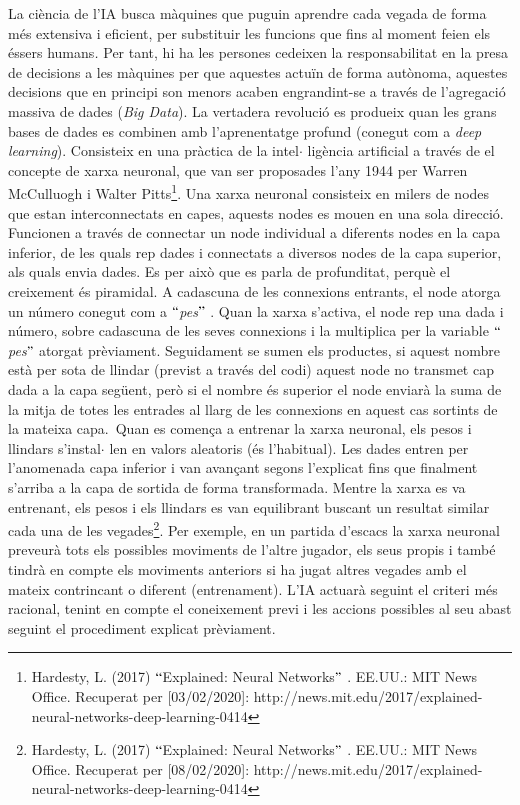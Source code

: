 \documentclass[12pt]{article}
\begin{document}
\vspace{\baselineskip}
\begin{justify}
La ciència de l’IA busca màquines que puguin aprendre cada vegada de forma més extensiva i eficient, per substituir les funcions que fins al moment feien els éssers humans\textit{. }Per tant, hi ha les persones cedeixen la responsabilitat en la presa de decisions a les màquines per que aquestes actuïn de forma autònoma, aquestes decisions que en principi son menors acaben engrandint-se a través de l’agregació massiva de dades (\textit{Big Data}).  La vertadera revolució es produeix quan les grans bases de dades es combinen amb l’aprenentatge profund (conegut com a \textit{deep learning}). Consisteix en una pràctica de la intel$ \cdot $ ligència artificial a través de el concepte de xarxa neuronal, que van ser proposades l’any 1944 per Warren McCulluogh i Walter Pitts\footnote{ Hardesty, L. (2017) $``$Explained: Neural Networks$"$ . EE.UU.: MIT News Office. Recuperat per [03/02/2020]: http://news.mit.edu/2017/explained-neural-networks-deep-learning-0414 }. Una xarxa neuronal consisteix en milers de nodes que estan interconnectats en capes, aquests nodes es mouen en una sola direcció. Funcionen a través de connectar un node individual a diferents nodes en la capa inferior, de les quals rep dades i connectats a diversos nodes de la capa superior, als quals envia dades. Es per això que es parla de profunditat, perquè el creixement és piramidal. A cadascuna de les connexions entrants, el node atorga un número conegut com a $``$\textit{pes}$"$ . Quan la xarxa s’activa, el node rep una dada i número, sobre cadascuna de les seves connexions i la multiplica per la variable $``$\textit{pes}$"$  atorgat prèviament. Seguidament se sumen els productes, si aquest nombre està per sota de llindar (previst a través del codi) aquest node no transmet cap dada a la capa següent, però si el nombre és superior el node enviarà la suma de la mitja de totes les entrades al llarg de les connexions en aquest cas sortints de la mateixa capa.\  Quan es comença a entrenar la xarxa neuronal, els pesos i llindars s’instal$ \cdot $ len en valors aleatoris (és l’habitual). Les dades entren per l’anomenada capa inferior i van avançant segons l’explicat fins que finalment s’arriba a la capa de sortida de forma transformada. Mentre la xarxa es va entrenant, els pesos i els llindars es van equilibrant buscant un resultat similar cada una de les vegades\footnote{ Hardesty, L. (2017) $``$Explained: Neural Networks$"$ . EE.UU.: MIT News Office. Recuperat per [08/02/2020]: http://news.mit.edu/2017/explained-neural-networks-deep-learning-0414 }.  Per exemple, en un partida d’escacs la xarxa neuronal preveurà tots els possibles moviments de l’altre jugador, els seus propis i també tindrà en compte els moviments anteriors si ha jugat altres vegades amb el mateix contrincant o diferent (entrenament). L’IA actuarà seguint el criteri més racional, tenint en compte el coneixement previ i les accions possibles al seu abast seguint el procediment explicat prèviament.
\end{justify}\par
\end{document}
